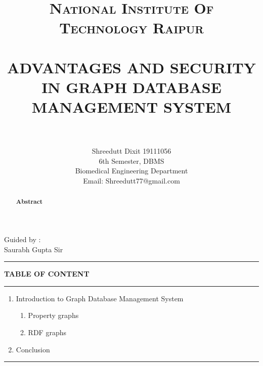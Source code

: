 \documentclass[paper=a4, fontsize=11pt]{scrartcl}
\title{
		\usefont{OT1}{bch}{b}{n}
		\normalfont \normalsize \textsc{National Institute Of Technology Raipur} \\ [25pt]
		\horrule{0.5pt} \\[0.4cm]
		\huge ADVANTAGES AND SECURITY IN GRAPH DATABASE MANAGEMENT SYSTEM  \\
		\horrule{2pt} \\[0.5cm]
}
\author{
        Shreedutt Dixit 19111056\\6th Semester, 
        DBMS\\ Biomedical Engineering Department\\	
        Email: Shreedutt77@gmail.com
        \normalsize
}
\date{}
\numberwithin{equation}{section}		%
\numberwithin{figure}{section}			%
\numberwithin{table}{section}				%
\begin{document}
\maketitle
\begin{flushright}
    Guided by :\\
    Saurabh Gupta Sir
\end{flushright}

\noindent\rule{\textwidth}{1pt}
\begin{abstract}

    \begin{center}
        \Large{\textbf{Abstract}}\\
        
    \end{center}
    \Large {  }
\end{abstract}


\newpage
\textbf{TABLE OF CONTENT}\\
\rule{\textwidth}{1pt}
\begin{enumerate}
    \item Introduction to Graph Database Management System
    \begin{enumerate}
      \item Property graphs
      \item RDF graphs
  \end{enumerate}
    \item Conclusion
\end{enumerate}
\rule{\textwidth}{1pt}
\newpage
\Large
\end{document}
